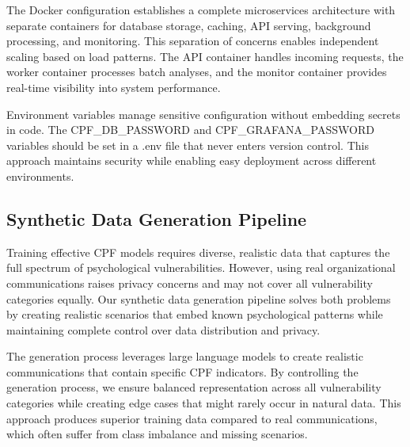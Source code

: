 \documentclass[11pt,a4paper]{article}
\begin{document}
The Docker configuration establishes a complete microservices architecture with separate containers for database storage, caching, API serving, background processing, and monitoring. This separation of concerns enables independent scaling based on load patterns. The API container handles incoming requests, the worker container processes batch analyses, and the monitor container provides real-time visibility into system performance.

Environment variables manage sensitive configuration without embedding secrets in code. The CPF\_DB\_PASSWORD and CPF\_GRAFANA\_PASSWORD variables should be set in a .env file that never enters version control. This approach maintains security while enabling easy deployment across different environments.

\subsection{Synthetic Data Generation Pipeline}

Training effective CPF models requires diverse, realistic data that captures the full spectrum of psychological vulnerabilities. However, using real organizational communications raises privacy concerns and may not cover all vulnerability categories equally. Our synthetic data generation pipeline solves both problems by creating realistic scenarios that embed known psychological patterns while maintaining complete control over data distribution and privacy.

The generation process leverages large language models to create realistic communications that contain specific CPF indicators. By controlling the generation process, we ensure balanced representation across all vulnerability categories while creating edge cases that might rarely occur in natural data. This approach produces superior training data compared to real communications, which often suffer from class imbalance and missing scenarios.
\end{document}
